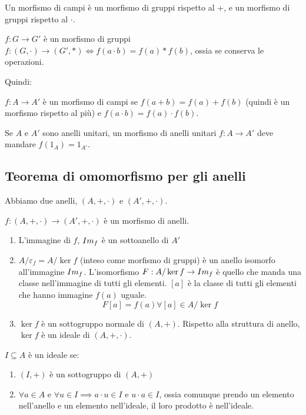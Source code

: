 Un morfismo di campi \`e un morfismo di gruppi rispetto al +, e un morfismo di gruppi rispetto al $\cdot$.

$f : G \to G'$ \`e un morfismo di gruppi $f : (G, \cdot) \to (G', \ast) \iff f(a \cdot b) = f(a) \ast f(b)$, ossia se conserva le operazioni.

Quindi:

$f : A \to A'$ \`e un morfismo di campi se $f(a + b) = f(a) + f(b)$ (quindi \`e un morfismo rispetto al pi\`u) e $f(a \cdot b) = f(a) \cdot f(b)$.

Se $A$ e $A'$ sono anelli unitari, un morfismo di anelli unitari $f : A \to A'$ deve mandare $f(1_A) = 1_{A'}$.

\subsection{Teorema di omomorfismo per gli anelli}

Abbiamo due anelli, $(A, +, \cdot)$ e $(A', +, \cdot)$.

$f : (A, +, \cdot) \to (A', +, \cdot)$ \`e un morfismo di anelli.

\begin{enumerate}
    \item L'immagine di $f$, $Im_{f}$ \`e un sottoanello di $A'$
    \item $A / \varepsilon_f = A / \ker f$ (inteso come morfismo di gruppi) \`e un anello isomorfo all'immagine $Im_{f}$. L'isomorfismo $F : A / \ker f \to Im_{f}$ \`e quello che manda una classe nell'immagine di tutti gli elementi. $[a]$ \`e la classe di tutti gli elementi che hanno immagine $f(a)$ uguale.
    \[
    F[a] = f(a) \forall [a] \in A / \ker f
    \]
    \item $\ker f$ \`e un sottogruppo normale di $(A, +)$. Rispetto alla struttura di anello, $\ker f$ \`e un ideale di $(A, +, \cdot)$.
\end{enumerate}

\begin{defn}
$I \subseteq A$ \`e un ideale se:
\begin{enumerate}
    \item $(I, +)$ \`e un sottogruppo di $(A, +)$
    \item $\forall a \in A$ e $\forall u \in I \implies a \cdot u \in I$ e $u \cdot a \in I$, ossia comunque prendo un elemento nell'anello e un elemento nell'ideale, il loro prodotto \`e nell'ideale.
\end{enumerate}
\end{defn}

